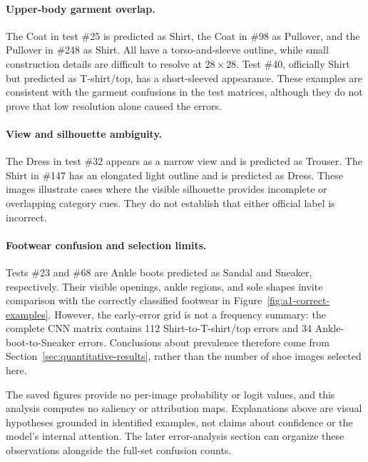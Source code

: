 \paragraph{Upper-body garment overlap.}
The Coat in test \#25 is predicted as Shirt, the Coat in \#98 as Pullover, and the Pullover in \#248 as Shirt. All have a torso-and-sleeve outline, while small construction details are difficult to resolve at $28\times28$. Test \#40, officially Shirt but predicted as T-shirt/top, has a short-sleeved appearance. These examples are consistent with the garment confusions in the test matrices, although they do not prove that low resolution alone caused the errors.

\paragraph{View and silhouette ambiguity.}
The Dress in test \#32 appears as a narrow view and is predicted as Trouser. The Shirt in \#147 has an elongated light outline and is predicted as Dress. These images illustrate cases where the visible silhouette provides incomplete or overlapping category cues. They do not establish that either official label is incorrect.

\paragraph{Footwear confusion and selection limits.}
Tests \#23 and \#68 are Ankle boots predicted as Sandal and Sneaker, respectively. Their visible openings, ankle regions, and sole shapes invite comparison with the correctly classified footwear in Figure~\ref{fig:a1-correct-examples}. However, the early-error grid is not a frequency summary: the complete CNN matrix contains 112 Shirt-to-T-shirt/top errors and 34 Ankle-boot-to-Sneaker errors. Conclusions about prevalence therefore come from Section~\ref{sec:quantitative-results}, rather than the number of shoe images selected here.

The saved figures provide no per-image probability or logit values, and this analysis computes no saliency or attribution maps. Explanations above are visual hypotheses grounded in identified examples, not claims about confidence or the model's internal attention. The later error-analysis section can organize these observations alongside the full-set confusion counts.
